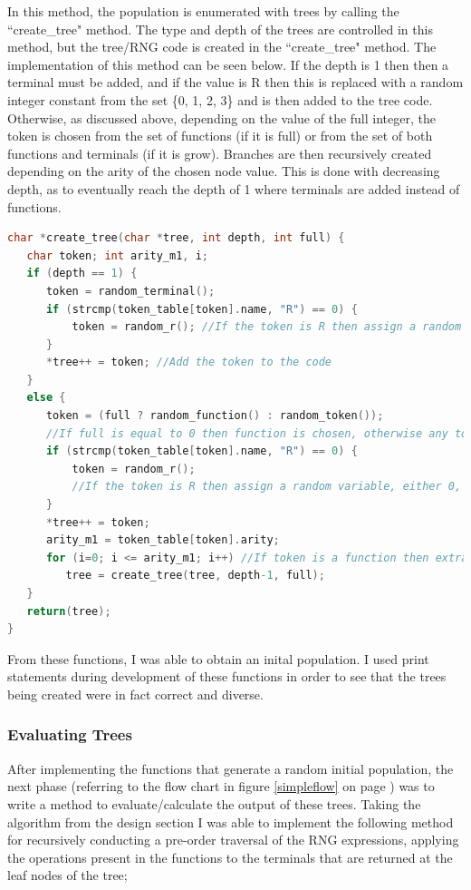 \documentclass[a4paper,10.5pt]{article}
\begin{document}
In this method, the population is enumerated with trees by calling the ``create\_tree" method. The type and depth of the trees are controlled in this method, but the tree/RNG code is created in the ``create\_tree" method. The implementation of this method can be seen below. If the depth is 1 then then a terminal must be added, and if the value is R then this is replaced with a random integer constant from the set \{0, 1, 2, 3\} and is then added to the tree code. Otherwise, as discussed above, depending on the value of the full integer, the token is chosen from the set of functions (if it is full) or from the set of both functions and terminals (if it is grow). Branches are then recursively created depending on the arity of the chosen node value. This is done with decreasing depth, as to eventually reach the depth of 1 where terminals are added instead of functions.

\begin{lstlisting}[language=C]
char *create_tree(char *tree, int depth, int full) { 
   char token; int arity_m1, i;
   if (depth == 1) {
      token = random_terminal();
	  if (strcmp(token_table[token].name, "R") == 0) {
		  token = random_r(); //If the token is R then assign a random variable, either 0, 1, 2 or 3
	  }
	  *tree++ = token; //Add the token to the code
   }
   else { 
	  token = (full ? random_function() : random_token()); 
	  //If full is equal to 0 then function is chosen, otherwise any token from F and T can be chosen
	  if (strcmp(token_table[token].name, "R") == 0) {
		  token = random_r(); 
 		  //If the token is R then assign a random variable, either 0, 1, 2 or 3
	  }
	  *tree++ = token;
      arity_m1 = token_table[token].arity;
      for (i=0; i <= arity_m1; i++) //If token is a function then extra branches are created
         tree = create_tree(tree, depth-1, full);
   }
   return(tree);
}
\end{lstlisting}

From these functions, I was able to obtain an inital population. I used print statements during development of these functions in order to see that the trees being created were in fact correct and diverse.
\subsubsection{Evaluating Trees}
After implementing the functions that generate a random initial population, the next phase (referring to the flow chart in figure \ref{simpleflow} on page \pageref{simpleflow}) was to write a method to evaluate/calculate the output of these trees. Taking the algorithm from the design section I was able to implement the following method for recursively conducting a pre-order traversal of the RNG expressions, applying the operations present in the functions to the terminals that are returned at the leaf nodes of the tree;
\end{document}
